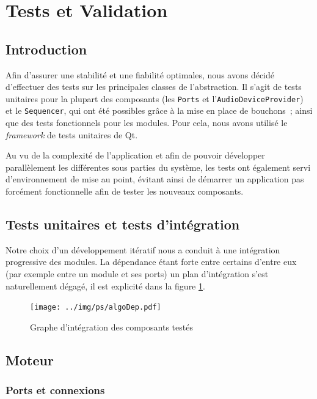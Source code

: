 \section{Tests et Validation}

\subsection{Introduction}

Afin
d'assurer une stabilité et une fiabilité optimales, nous avons décidé d'effectuer des tests sur les principales classes de l'abstraction. Il s'agit de tests unitaires pour la plupart des composants (les \verb!Ports! et l'\verb!AudioDeviceProvider!) et le \verb!Sequencer!, qui ont été possibles grâce à la mise en place de bouchons~;
ainsi que des tests fonctionnels pour les modules.
Pour cela, nous avons utilisé le \emph{framework} de tests
unitaires de Qt.

Au vu de la complexité de l'application et afin de pouvoir développer parallèlement les différentes sous parties du système, les tests ont également servi d'environnement de mise au point, évitant ainsi de démarrer un application pas forcément fonctionnelle afin de tester les nouveaux composants.

\subsection{Tests unitaires et tests d'intégration}

Notre choix d'un développement itératif nous a conduit à une intégration progressive des modules. La dépendance étant forte entre certains d'entre eux (par exemple entre un module et ses ports) un plan d'intégration s'est naturellement dégagé, il est explicité dans la figure \ref{integration}.
\begin{figure}[ht]
\centering
\texttt{[image: ../img/ps/algoDep.pdf]}
\caption{Graphe d’intégration des composants testés}
\label{integration}
\end{figure}
\subsection{Moteur}

\subsubsection{Ports et connexions}

